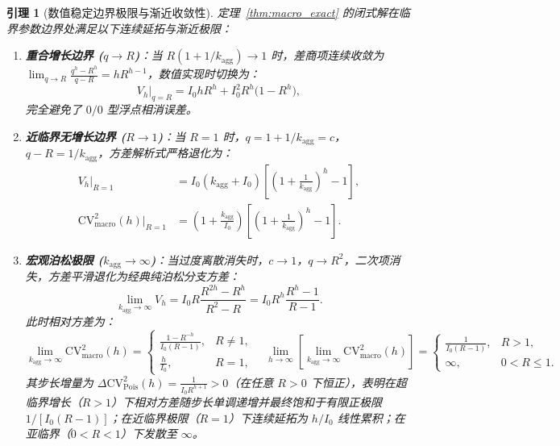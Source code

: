 \documentclass[11pt,a4paper]{article}
\theoremstyle{plain}
\newtheorem{lemma}{引理}
\theoremstyle{definition}
\begin{document}
\begin{lemma}[数值稳定边界极限与渐近收敛性]\label{lem:macro_boundaries}
定理~\ref{thm:macro_exact} 的闭式解在临界参数边界处满足以下连续延拓与渐近极限：
\begin{enumerate}
\item \textbf{重合增长边界 ($q \to R$)}：当 $R(1 + 1/k_{\text{agg}}) \to 1$ 时，差商项连续收敛为 $\lim_{q\to R} \frac{q^h - R^h}{q - R} = h R^{h-1}$，数值实现时切换为：
\begin{equation}
V_h \Big|_{q=R} = I_0 h R^h + I_0^2 R^h \bigl(1 - R^h\bigr), \label{eq:bound_q_eq_R}
\end{equation}
完全避免了 $0/0$ 型浮点相消误差。
\item \textbf{近临界无增长边界 ($R \to 1$)}：当 $R = 1$ 时，$q = 1 + 1/k_{\text{agg}} = c$，$q - R = 1/k_{\text{agg}}$，方差解析式严格退化为：
\begin{align}
V_h \Big|_{R=1} &= I_0 (k_{\text{agg}} + I_0) \left[ \left(1 + \frac{1}{k_{\text{agg}}}\right)^h - 1 \right], \label{eq:bound_R_eq_1} \\
\text{CV}^2_{\text{macro}}(h) \Big|_{R=1} &= \left(1 + \frac{k_{\text{agg}}}{I_0}\right) \left[ \left(1 + \frac{1}{k_{\text{agg}}}\right)^h - 1 \right]. \label{eq:bound_R_eq_1_cv}
\end{align}
\item \textbf{宏观泊松极限 ($k_{\text{agg}} \to \infty$)}：当过度离散消失时，$c \to 1$，$q \to R^2$，二次项消失，方差平滑退化为经典纯泊松分支方差：
\begin{equation}
\lim_{k_{\text{agg}}\to\infty} V_h = I_0 R \frac{R^{2h} - R^h}{R^2 - R} = I_0 R^h \frac{R^h - 1}{R - 1}. \label{eq:poisson_macro_limit}
\end{equation}
此时相对方差为：
\begin{equation}
\lim_{k_{\text{agg}}\to\infty} \text{CV}^2_{\text{macro}}(h) = \begin{cases} \frac{1 - R^{-h}}{I_0 (R - 1)}, & R \neq 1, \\[3pt] \frac{h}{I_0}, & R = 1, \end{cases} \quad
\lim_{h\to\infty} \left[ \lim_{k_{\text{agg}}\to\infty} \text{CV}^2_{\text{macro}}(h) \right] = \begin{cases} \frac{1}{I_0 (R - 1)}, & R > 1, \\[3pt] \infty, & 0 < R \le 1. \end{cases}
\label{eq:poisson_cv2_limit}
\end{equation}
其步长增量为 $\Delta \text{CV}^2_{\text{Pois}}(h) = \frac{1}{I_0 R^{h+1}} > 0$（在任意 $R>0$ 下恒正），表明在超临界增长（$R>1$）下相对方差随步长单调递增并最终饱和于有限正极限 $1/[I_0(R-1)]$；在近临界极限（$R = 1$）下连续延拓为 $h/I_0$ 线性累积；在亚临界（$0<R<1$）下发散至 $\infty$。

\end{enumerate}
\end{lemma}
\end{document}
